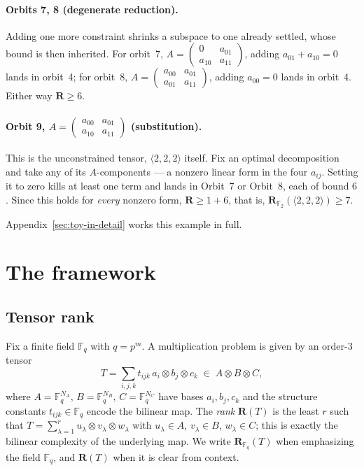 \documentclass[11pt]{article}
\theoremstyle{definition}
\newcommand{\F}{\mathbb{F}}
\newcommand{\R}{\mathbf{R}}
\newcommand{\Rk}[2]{\mathbf{R}_{#1}(#2)}
\newcommand{\mmt}[3]{\langle #1,#2,#3\rangle}
\begin{document}
\paragraph{Orbits 7, 8 (degenerate reduction).} Adding one more constraint shrinks a
subspace to one already settled, whose bound is then inherited. For orbit~7,
$A=\left(
  \begin{smallmatrix}0&a_{01}\\a_{10}&a_{11}
\end{smallmatrix}\right)$, adding
$a_{01}+a_{10}=0$ lands in orbit~4; for orbit~8,
$A=\left(
  \begin{smallmatrix}a_{00}&a_{01}\\a_{01}&a_{11}
\end{smallmatrix}\right)$,
adding $a_{00}=0$ lands in orbit~4. Either way $\R\ge6$.

\paragraph{Orbit 9, $A=\left(
    \begin{smallmatrix}a_{00}&a_{01}\\a_{10}&a_{11}
\end{smallmatrix}\right)$ (substitution).}
This is the unconstrained tensor, $\mmt{2}{2}{2}$ itself. Fix an optimal decomposition
and take any of its $A$-components --- a nonzero linear form in the four $a_{ij}$.
Setting it to zero kills at least one term and lands in Orbit~7 or Orbit~8, each of
bound $6$. Since this holds for \emph{every} nonzero form, $\R\ge 1+6$, that is,
$ \Rk{\F_2}{\mmt{2}{2}{2}}\ge 7$.

Appendix~\ref{sec:toy-in-detail} works this example in full.

\section{The framework}\label{sec:framework}

\subsection{Tensor rank}

Fix a finite field $\F_q$ with $q=p^m$. A multiplication problem is given by an
order-$3$ tensor
\[
  T = \sum_{i,j,k} t_{ijk}\, a_i \otimes b_j \otimes c_k
  \;\in\; A \otimes B \otimes C,
\]
where $A=\F_q^{N_A}$, $B=\F_q^{N_B}$, $C=\F_q^{N_C}$ have bases $a_i,b_j,c_k$ and
the structure constants $t_{ijk}\in\F_q$ encode the bilinear map. The
\emph{rank} $\R(T)$ is the least $r$ such that
$T=\sum_{\lambda=1}^{r} u_\lambda\otimes v_\lambda\otimes w_\lambda$ with
$u_\lambda\in A$, $v_\lambda\in B$, $w_\lambda\in C$; this is exactly the bilinear
complexity of the underlying map. We write $\Rk{\F_q}{T}$ when emphasizing the field $\F_q$,
and $\R(T)$ when it is clear from context.
\end{document}
